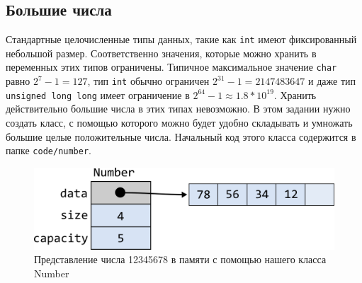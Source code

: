\documentclass{article}
\begin{document}
\subsection{Большие числа}
Стандартные целочисленные  типы данных, такие как \texttt{int} имеют фиксированный небольшой размер. Соответственно значения, которые можно хранить в переменных этих типов ограничены. Типичное максимальное значение \texttt{char} равно $2^7 - 1 = 127$, тип \texttt{int} обычно ограничен $2^{31}-1 = 2147483647$ и даже тип \texttt{unsigned long long} имеет ограничение в $2^{64}-1 \approx 1.8 * 10^{19}$. Хранить действительно большие числа в этих типах невозможно. В этом задании нужно создать класс, с помощью которого можно будет удобно складывать и умножать большие целые положительные числа. Начальный код этого класса содержится в папке \texttt{code/number}.

\begin{figure}[h!]
\centering
\includegraphics[scale=0.8]{../images/number1.png}
\captionsetup{labelformat=empty}
\caption{Представление числа 12345678 в памяти с помощью нашего класса Number}
\label{fig:nummber1}
\end{figure}
\end{document}
